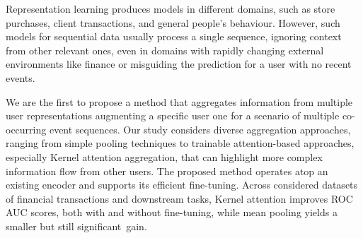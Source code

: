 
Representation learning produces models in different domains, such as store purchases, client transactions, and general people's behaviour. 
However, such models for sequential data usually process a single sequence, ignoring context from other relevant ones, even in domains with rapidly changing external environments like finance or misguiding the prediction for a user with no recent events. 


We are the first to propose a method that aggregates information from multiple user representations augmenting a specific user one for a scenario of multiple co-occurring event sequences.
Our study considers diverse aggregation approaches, ranging from simple pooling techniques to trainable attention-based approaches, especially Kernel attention aggregation, that can highlight more complex information flow from other users.
The proposed method operates atop an existing encoder and supports its efficient fine-tuning. 
Across considered datasets of financial transactions and downstream tasks, Kernel attention improves ROC AUC scores, both with and without fine-tuning, while mean pooling yields a smaller but still significant~gain. 






